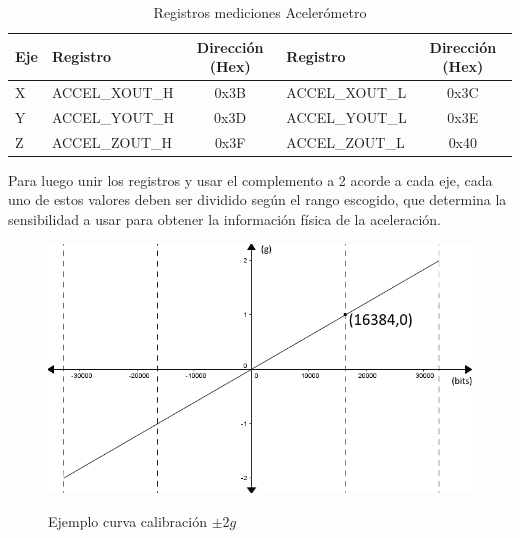 \documentclass[12pt,a4paper]{article}
\begin{document}
\begin{itemize}
	\begin{table}[H]
		\centering
		\label{table:registrosaccel}
		\begin{tabular}{|l|l|c|l|c|}
			\hline
			\textbf{Eje} & \textbf{Registro} & \textbf{Dirección (Hex)} & \textbf{Registro} & \textbf{Dirección (Hex)} \\ \hline
			X            & ACCEL\_XOUT\_H     & 0x3B                     & ACCEL\_XOUT\_L     & 0x3C                     \\ \hline
			Y            & ACCEL\_YOUT\_H     & 0x3D                     & ACCEL\_YOUT\_L     & 0x3E                     \\ \hline
			Z            & ACCEL\_ZOUT\_H     & 0x3F                     & ACCEL\_ZOUT\_L     & 0x40                     \\ \hline
		\end{tabular}
		\caption{Registros mediciones Acelerómetro}					
	\end{table}				
					
	Para luego unir los registros y usar el complemento a 2 acorde a cada eje, cada uno de estos valores deben ser dividido según el rango escogido, que determina la sensibilidad a usar para obtener la información física de la aceleración.
	
	\begin{figure}[H]
		\centering
		\includegraphics[scale=0.6]{images/curvacalibracion}
		\label{fig:curvacalibracion}
		\caption{Ejemplo curva calibración $\pm 2g$}
	\end{figure}
	
\end{itemize}
\end{document}

